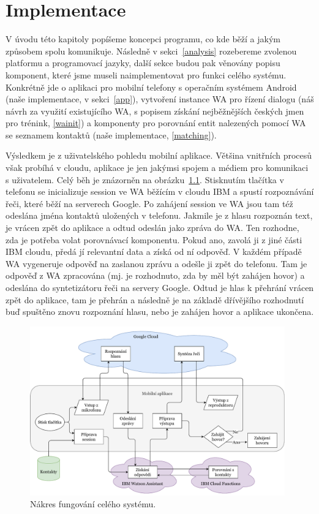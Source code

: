 \chapter{Implementace}\label{chapter-implementation}

V úvodu této kapitoly popíšeme koncepci programu, co kde
běží a jakým způsobem spolu komunikuje. Následně v sekci~\ref{analysis}
rozebereme zvolenou platformu a programovací jazyky,
další sekce budou pak věnovány popisu komponent, které jsme museli
naimplementovat pro funkci celého systému. Konkrétně jde o aplikaci pro
mobilní telefony s operačním systémem Android (naše implementace,
v sekci~\ref{app}), vytvoření instance WA pro řízení
dialogu (náš návrh za využití existujícího WA,
s popisem získání nejběžnějších českých jmen pro trénink, \ref{wainit}) a komponenty
pro porovnání entit nalezených pomocí WA se seznamem kontaktů (naše implementace,
\ref{matching}).

Výsledkem je z uživatelského pohledu mobilní
aplikace. Většina vnitřních procesů však probíhá v cloudu, aplikace
je jen jakýmsi spojem a médiem pro komunikaci s uživatelem. Celý běh
je znázorněn na obrázku~\ref{img-flowchart}. Stisknutím tlačítka v
telefonu se
inicializuje session ve WA běžícím v cloudu IBM a spustí rozpoznávání řeči,
které běží na serverech Google. Po zahájení session ve WA jsou tam též
odeslána jména kontaktů uložených v telefonu. Jakmile je z hlasu rozpoznán
text, je vrácen zpět do aplikace a odtud odeslán jako zpráva do WA.
Ten rozhodne, zda je potřeba volat
porovnávací komponentu. Pokud ano, zavolá ji z jiné části IBM cloudu,
předá jí relevantní data a získá od ní odpověď. V každém případě
WA vygeneruje odpověď na zaslanou zprávu a odešle ji zpět do telefonu.
Tam je odpověď z WA zpracována (mj. je rozhodnuto, zda by měl být
zahájen hovor) a odeslána do syntetizátoru řeči na servery Google.
Odtud je hlas k přehrání vrácen zpět do aplikace, tam je přehrán
a následně je na základě dřívějšího rozhodnutí buď spuštěno znovu
rozpoznání hlasu, nebo je zahájen hovor a aplikace ukončena.


\begin{figure}[h]
    \centering
    \includegraphics[width=0.98\textwidth]{../img/app-flowchart.pdf}
    \caption{Nákres fungování celého systému.}
    \label{img-flowchart}
\end{figure}

